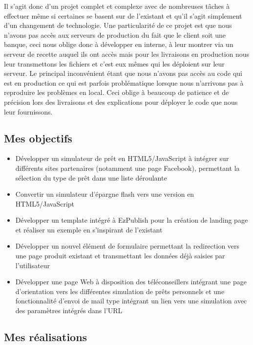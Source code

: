 \documentclass[a4paper,11pt,twoside]{report}
\begin{document}
    Il s'agit donc d'un projet complet et complexe avec de nombreuses tâches à effectuer même si certaines se basent sur de l'existant et qu'il s'agit simplement d'un changement de technologie. Une particularité de ce projet est que nous n'avons pas accès aux serveurs de production du fait que le client soit une banque, ceci nous oblige donc à développer en interne, à leur montrer via un serveur de recette auquel ils ont accès mais pour les livraisons en production nous leur transmettons les fichiers et c'est eux mêmes qui les déploient sur leur serveur. Le principal inconvénient étant que nous n'avons pas accès au code qui est en production ce qui est parfois problématique lorsque nous n'arrivons pas à reproduire les problèmes en local. Ceci oblige à beaucoup de patience et de précision lors des livraisons et des explications pour déployer le code que nous leur fournissons.  
    \subsection*{Mes objectifs}
      \begin{itemize}

	\item Développer un simulateur de prêt en HTML5/JavaScript à intégrer sur différents sites partenaires (notamment une page Facebook), permettant la sélection du type de prêt dans une liste déroulante
	\item Convertir un simulateur d'épargne flash vers une version en HTML5/JavaScript 
	\item Développer un template intégré à EzPublish pour la création de landing page et réaliser un exemple en s'inspirant de l'existant
	\item Développer un nouvel élément de formulaire permettant la redirection vers une page produit existant et transmettant les données déjà saisies par l'utilisateur
 	\item Développer une page Web à disposition des téléconseillers intégrant une page d’orientation vers les différentes simulation de prêts personnels et une fonctionnalité d’envoi de mail type intégrant un lien vers une simulation avec des paramètres intégrés dans l’URL

      \end{itemize}
    \subsection*{Mes réalisations}
\end{document}
